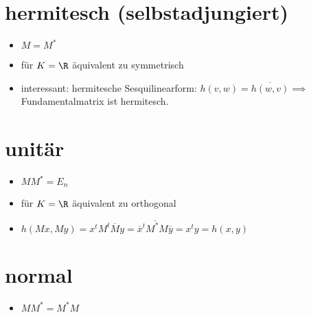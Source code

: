 \documentclass{article}
\begin{document}
    \section{hermitesch (selbstadjungiert)}
    \begin{itemize}
        \item $M = M^*$
        \item für $K = \R$ äquivalent zu symmetrisch
        \item interessant: hermitesche Sesquilinearform: $h(v,w) = \overline{h(w,v)} \implies $ Fundamentalmatrix ist hermitesch.
    \end{itemize}
    \section{unitär}
    \begin{itemize}
        \item $M M^* = E_n$
        \item für $K = \R$ äquivalent zu orthogonal
        \item $h(Mx, My) = x^tM^t\overline{M}y = \overline{\overline{x}^tM^* M \overline{y}} = x^ty = h(x,y)$
    \end{itemize}
    \section{normal}
    \begin{itemize}
        \item $M M^* = M^*M$
    \end{itemize}
\end{document}
